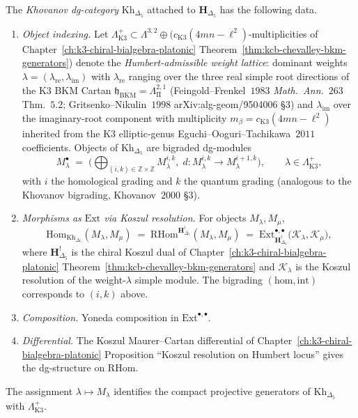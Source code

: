 \begin{definition}
\label{def:k3qt-khovanov-dg-category}
The \emph{Khovanov dg-category} $\mathrm{Kh}_{\Delta_5}$ attached to
$\mathbf H_{\Delta_5}$ has the following data.
\begin{enumerate}[label=\textup{(\roman*)}]
\item \emph{Object indexing.} Let $\Lambda_{\mathrm{K3}}^+\subset
\Lambda^{3,2}\oplus(c_{\mathrm K3}(4mn - \ell^2)$-multiplicities of
Chapter~\ref{ch:k3-chiral-bialgebra-platonic}
Theorem~\ref{thm:kcb-chevalley-bkm-generators}) denote the
\emph{Humbert-admissible weight lattice}: dominant weights
$\lambda = (\lambda_{\mathrm{re}}, \lambda_{\mathrm{im}})$ with
$\lambda_{\mathrm{re}}$ ranging over the three real simple root
directions of the K3 BKM Cartan
$\mathfrak h_{\mathrm{BKM}} = \Lambda^{2,1}_{\mathrm{II}}$ (Feingold--Frenkel~$1983$
\emph{Math.\ Ann.}~$263$ Thm.\ $5.2$; Gritsenko--Nikulin~$1998$
arXiv:alg-geom/9504006 \S $3$) and $\lambda_{\mathrm{im}}$ over the
imaginary-root component with multiplicity $m_\beta =
c_{\mathrm{K3}}(4mn - \ell^2)$ inherited from the K3 elliptic-genus
Eguchi--Ooguri--Tachikawa~$2011$ coefficients. Objects of
$\mathrm{Kh}_{\Delta_5}$ are bigraded dg-modules
\[
 M_\lambda^\bullet \;=\;
 \bigl( \bigoplus_{(i, k)\in\mathbb Z\times\mathbb Z} M_\lambda^{i, k},\;
 d : M_\lambda^{i, k}\to M_\lambda^{i + 1, k} \bigr),
 \qquad \lambda\in\Lambda_{\mathrm{K3}}^+,
\]
with $i$ the homological grading and $k$ the quantum grading
(analogous to the Khovanov bigrading, Khovanov~$2000$ \S $3$).
\item \emph{Morphisms as $\mathrm{Ext}$ via Koszul resolution.} For
objects $M_\lambda, M_\mu$,
\[
 \mathrm{Hom}_{\mathrm{Kh}_{\Delta_5}}(M_\lambda, M_\mu)
 \;=\;
 \mathrm{RHom}^{\mathbf H_{\Delta_5}^{!}}(M_\lambda, M_\mu)
 \;=\;
 \mathrm{Ext}^{\bullet,\bullet}_{\mathbf H_{\Delta_5}^{!}}
 \bigl(\mathcal K_\lambda, \mathcal K_\mu\bigr),
\]
where $\mathbf H_{\Delta_5}^{!}$ is the chiral Koszul dual of
Chapter~\ref{ch:k3-chiral-bialgebra-platonic}
Theorem~\ref{thm:kcb-chevalley-bkm-generators} and
$\mathcal K_\lambda$ is the Koszul resolution of the
weight-$\lambda$ simple module. The bigrading
$(\mathrm{hom},\mathrm{int})$ corresponds to $(i, k)$ above.
\item \emph{Composition.} Yoneda composition in
$\mathrm{Ext}^{\bullet,\bullet}$.
\item \emph{Differential.} The Koszul Maurer--Cartan differential of
Chapter~\ref{ch:k3-chiral-bialgebra-platonic} Proposition
``Koszul resolution on Humbert locus'' gives the dg-structure on
$\mathrm{RHom}$.
\end{enumerate}
The assignment $\lambda\mapsto M_\lambda$ identifies the compact
projective generators of $\mathrm{Kh}_{\Delta_5}$ with
$\Lambda_{\mathrm{K3}}^+$.
\end{definition}

